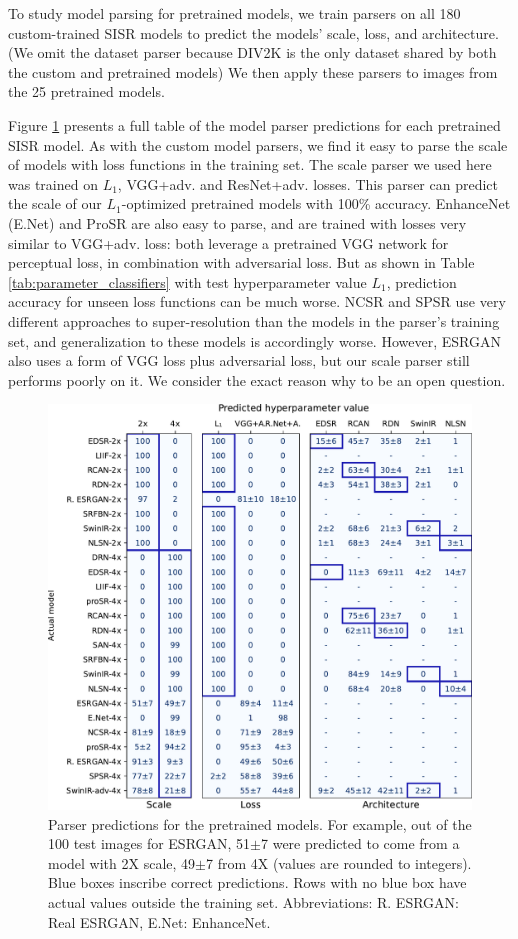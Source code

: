 \documentclass[10pt]{article} %
\begin{document}
To study model parsing for pretrained models, we train parsers on all 180 custom-trained SISR models to predict the models' scale, loss, and architecture. (We omit the dataset parser because DIV2K is the only dataset shared by both the custom and pretrained models) We then apply these parsers to images from the 25 pretrained models. 

Figure \ref{fig:pretrained_model_parsing} presents a full table of the model parser predictions for each pretrained SISR model. As with the custom model parsers, we find it easy to parse the scale of models with loss functions in the training set. The scale parser we used here was trained on $L_1$, VGG+adv. and ResNet+adv. losses. This parser can predict the scale of our $L_1$-optimized pretrained models with 100\% accuracy. EnhanceNet (E.Net) and ProSR are also easy to parse, and are trained with losses very similar to VGG+adv. loss: both leverage a pretrained VGG network for perceptual loss, in combination with adversarial loss. But as shown in Table \ref{tab:parameter_classifiers} with test hyperparameter value $L_1$, prediction accuracy for unseen loss functions can be much worse. NCSR and SPSR use very different approaches to super-resolution than the models in the parser's training set, and generalization to these models is accordingly worse. However, ESRGAN also uses a form of VGG loss plus adversarial loss, but our scale parser still performs poorly on it. We consider the exact reason why to be an open question.

\begin{figure}
  \vspace{-1em}
  \centering
    \includegraphics[width=.65\textwidth]{figures/pretrained-model-parsing-table.pdf}
  \caption{Parser predictions for the pretrained models. For example, out of the 100 test images for ESRGAN, 51$\pm$7 were predicted to come from a model with 2X scale, 49$\pm$7 from 4X (values are rounded to integers).  Blue boxes inscribe correct predictions. Rows with no blue box have actual values outside the training set. Abbreviations: R. ESRGAN: Real ESRGAN, E.Net: EnhanceNet.}
  \label{fig:pretrained_model_parsing}
\end{figure}
\end{document}
